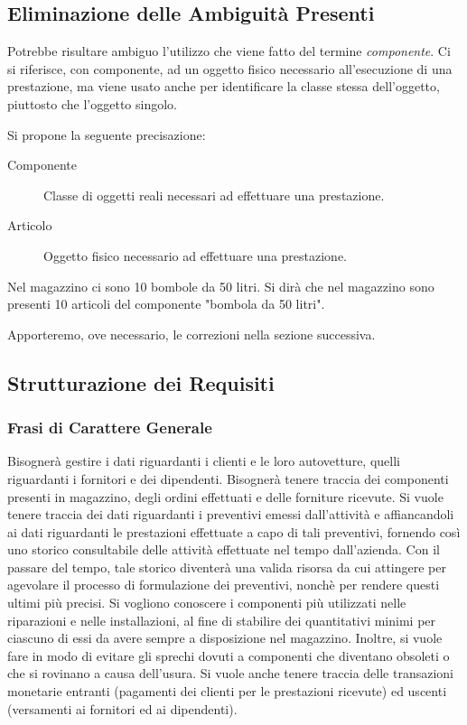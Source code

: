 	\subsection{Eliminazione delle Ambiguità Presenti}
		
		Potrebbe risultare ambiguo l'utilizzo che viene fatto del termine \emph{componente}. Ci si riferisce, con componente, ad un oggetto fisico necessario all'esecuzione di una prestazione, ma viene usato anche per identificare la classe stessa dell'oggetto, piuttosto che l'oggetto singolo.
		
		Si propone la seguente precisazione:
		\begin{description}
			\item[Componente]
				Classe di oggetti reali necessari ad effettuare una prestazione.
			\item[Articolo]
				Oggetto fisico necessario ad effettuare una prestazione.
		\end{description}
		
		\begin{example}
			Nel magazzino ci sono 10 bombole da 50 litri. Si dirà che nel magazzino sono presenti 10 articoli del componente "bombola da 50 litri".
		\end{example}
		
		Apporteremo, ove necessario, le correzioni nella sezione successiva.
		
	\subsection{Strutturazione dei Requisiti}
	
		\subsubsection{Frasi di Carattere Generale}
					
			Bisognerà gestire i dati riguardanti i clienti e le loro autovetture, quelli riguardanti i fornitori e dei dipendenti. Bisognerà tenere traccia dei componenti presenti in magazzino, degli ordini effettuati e delle forniture ricevute.
			Si vuole tenere traccia dei dati riguardanti i preventivi emessi dall'attività e affiancandoli ai dati riguardanti le prestazioni effettuate a capo di tali preventivi, fornendo così uno storico consultabile delle attività effettuate nel tempo dall'azienda. Con il passare del tempo, tale storico diventerà una valida risorsa da cui attingere per agevolare il processo di formulazione dei preventivi, nonchè per rendere questi ultimi più precisi.
			Si vogliono conoscere i componenti più utilizzati nelle riparazioni e nelle installazioni, al fine di stabilire dei quantitativi minimi per ciascuno di essi da avere sempre a disposizione nel magazzino. Inoltre, si vuole fare in modo di evitare gli sprechi dovuti a componenti che diventano obsoleti o che si rovinano a causa dell'usura.
			Si vuole anche tenere traccia delle transazioni monetarie entranti (pagamenti dei clienti per le prestazioni ricevute) ed uscenti (versamenti ai fornitori ed ai dipendenti).
			
